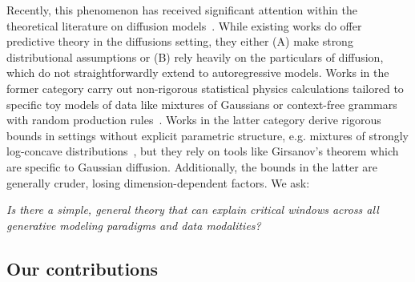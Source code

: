 Recently, this phenomenon has received significant attention within the theoretical literature on diffusion models~\citep{raya2023spontaneous,sclocchi2024probinglatenthierarchicalstructure,sclocchi2024phasetransitiondiffusionmodels,biroli2024dynamical,li2024criticalwindowsnonasymptotictheory}. While existing works do offer predictive theory in the diffusions setting, they either (A) make strong distributional assumptions or (B) rely heavily on the particulars of diffusion, which do not straightforwardly extend to autoregressive models. Works in the former category carry out non-rigorous statistical physics calculations tailored to specific toy models of data like mixtures of Gaussians or context-free grammars with random production rules~\citep{sclocchi2024phasetransitiondiffusionmodels,sclocchi2024probinglatenthierarchicalstructure,biroli2024dynamical,raya2023spontaneous}. Works in the latter category derive rigorous bounds in settings without explicit parametric structure, e.g. mixtures of strongly log-concave distributions~\citep{li2024criticalwindowsnonasymptotictheory}, but they rely on tools like Girsanov's theorem which are specific to Gaussian diffusion. Additionally, the bounds in the latter are generally cruder, losing dimension-dependent factors. We ask:
\begin{center}
\emph{Is there a simple, general theory that can explain critical windows across all generative modeling paradigms and data modalities?}
\end{center}

\subsection{Our contributions}

